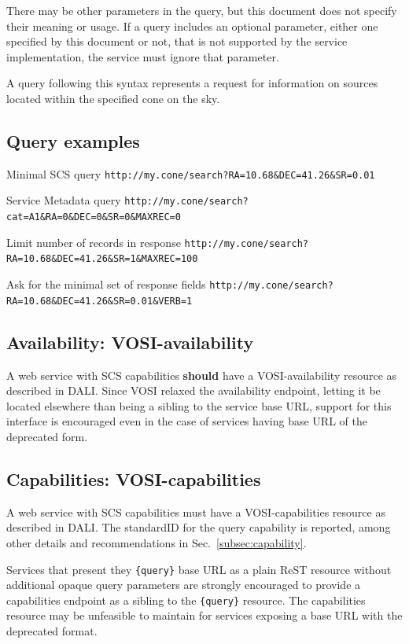 \documentclass[11pt,a4paper]{ivoa}
\begin{document}
There may be other parameters in the query, but this document does not specify their meaning or usage. If a query includes an optional parameter, either one specified by this document or not, that is not supported by the service implementation, the service must ignore that parameter.

A query following this syntax represents a request for information on sources located within the specified cone on the sky.

\subsection{Query examples}
\begin{bigdescription}
\item[Minimal SCS query] \nolinkurl{http://my.cone/search?RA=10.68\&DEC=41.26\&SR=0.01}
\item[Service Metadata query] \nolinkurl{http://my.cone/search?cat=A1\&RA=0\&DEC=0\&SR=0\&MAXREC=0}
\item[Limit number of records in response] \nolinkurl{http://my.cone/search?RA=10.68\&DEC=41.26\&SR=1\&MAXREC=100}
\item[Ask for the minimal set of response fields] \nolinkurl{http://my.cone/search?RA=10.68\&DEC=41.26\&SR=0.01\&VERB=1}
\end{bigdescription}

\subsection{Availability: VOSI-availability}
A web service with SCS capabilities \textbf{should} have a VOSI-availability resource as described in DALI. Since VOSI relaxed the availability endpoint, letting it be located elsewhere than being a sibling to the service base URL, support for this interface is encouraged even in the case of services having base URL of the deprecated form.

\subsection{Capabilities: VOSI-capabilities}
A web service with SCS capabilities must have a VOSI-capabilities resource as described in DALI. The standardID for the {query} capability is reported, among other details and recommendations in Sec.~\ref{subsec:capability}.

Services that present they \texttt{\{query\}} base URL as a plain ReST resource without additional opaque query parameters are strongly encouraged to provide a capabilities endpoint as a sibling to the \texttt{\{query\}} resource. The capabilities resource may be unfeasible to maintain for services exposing a base URL with the deprecated format.
\end{document}
